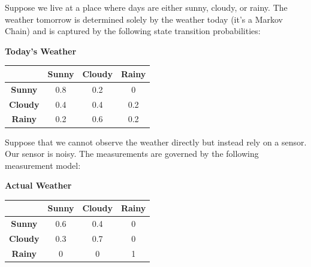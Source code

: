 \documentclass[answers]{exam}
\begin{document}
\begin{questions}
    \question[20]
    Suppose we live at a place where days are either sunny, cloudy, or rainy. The weather tomorrow is determined solely by the weather today (it’s a Markov Chain) and is captured by the following state transition probabilities:
    \begin{center}
        \textbf{Today's Weather} \\
        \begin{tabular}{|c|c|c|c|}
            \hline
            \textbf{}       & \textbf{Sunny} & \textbf{Cloudy} & \textbf{Rainy} \\ \hline
            \textbf{Sunny}  & 0.8            & 0.2             & 0              \\ \hline
            \textbf{Cloudy} & 0.4            & 0.4             & 0.2            \\ \hline
            \textbf{Rainy}  & 0.2            & 0.6             & 0.2            \\ \hline
        \end{tabular}
    \end{center}
    Suppose that we cannot observe the weather directly but instead rely on a sensor. Our sensor is noisy. The measurements are governed by the following measurement model:
    \begin{center}
        \textbf{Actual Weather} \\
        \begin{tabular}{|c|c|c|c|}
            \hline
            \textbf{}       & \textbf{Sunny} & \textbf{Cloudy} & \textbf{Rainy} \\ \hline
            \textbf{Sunny}  & 0.6            & 0.4             & 0              \\ \hline
            \textbf{Cloudy} & 0.3            & 0.7             & 0              \\ \hline
            \textbf{Rainy}  & 0              & 0               & 1              \\ \hline
        \end{tabular}
    \end{center}
\end{questions}
\end{document}
